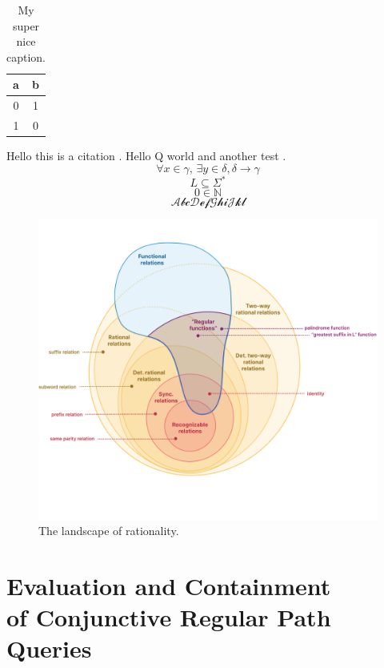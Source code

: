 \documentclass[a4paper,sfsidenotes,twoside,justified,nobib]{tufte-book-custom}
\begin{document}

\begin{table}
	\centering
	\begin{tabular}{cc}
		\toprule
		a & b \\ \midrule
		0 & 1 \\
		1 & 0 \\ \bottomrule
	\end{tabular}
	\caption{My super nice caption.}
\end{table}

\citereset
Hello this is a citation \cite{Bringhurst2005}.
Hello Q world and another test \cite{Bringhurst2005}.
\[\forall x \in \gamma,\, \exists y\in \delta, \delta \to \gamma\]
\[L \subseteq \Sigma^*\]
\[0 \in \mathbb{N}\]
\[\mathcal{AbcDefGhiJkl}\]

\lipsum[1-2]

\begin{figure}[htb]
	\centering
	\includegraphics[width=\linewidth]{fig/landscape.png}
	\caption{The landscape of rationality.}
\end{figure}

\lipsum[3-10]

\chapter[Evaluation and Containment of Conjunctive Regular Path Queries]{Evaluation and Containment\\ of Conjunctive Regular Path Queries}
\end{document}

